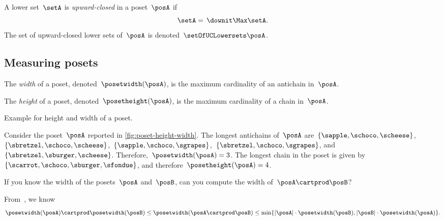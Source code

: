 \begin{definition}
    \label{def:upward-closed-lowerset}
    A lower set~$\setA$ is \emph{upward-closed} in a poset~$\posA$ if
    \begin{equation}
        \setA =\, \downit  \Max \setA.
    \end{equation}
    The set of upward-closed lower sets of~$\posA$ is denoted~$\setOfUCLowersets \posA$.

\end{definition}

\subsection{Measuring posets}
\begin{definition}
    \label{def:poset-width}
    The \emph{width} of a poset, denoted~$\posetwidth(\posA)$, is the maximum cardinality of an antichain in~$\posA$.
\end{definition}

\begin{definition}
    \label{def:poset-height}
    The \emph{height} of a poset, denoted~$\posetheight(\posA)$, is the maximum cardinality of a chain in~$\posA$.
\end{definition}

\begin{marginfigure}
    \centering
    \caption{Example for height and width of a poset.}
    \label{fig:poset-height-width}
\end{marginfigure}

\begin{example}
    Consider the poset~$\posA$ reported in \cref{fig:poset-height-width}.
    The longest antichains of~$\posA$ are~$\{\sapple, \schoco, \scheese\}$,~$\{\sbretzel, \schoco, \scheese\}$,~$\{\sapple, \schoco, \sgrapes\}$,~$\{\sbretzel, \schoco, \sgrapes\}$, and~$\{\sbretzel, \sburger, \scheese\}$.
    Therefore,~$\posetwidth(\posA)=3$.
    The longest chain in the poset is given by~$\{\scarrot,\schoco,\sburger,\sfondue\}$, and therefore~$\posetheight(\posA)=4$.
\end{example}

\begin{exercise}
    \label{ex:width}
    If you know the width of the posets~$\posA$ and~$\posB$, can you compute the width of~$\posA\cartprod\posB$?
\end{exercise}
\begin{solution}
    From~\cite{bezrukovantichains}, we know
    \begin{equation*}
        \posetwidth(\posA)\cartprod \posetwidth(\posB)\leq \posetwidth(\posA\cartprod \posB)\leq \min \{ \vert \posA\vert \cdot \posetwidth(\posB),\vert \posB \vert \cdot \posetwidth(\posA)\}.
    \end{equation*}
\end{solution}

